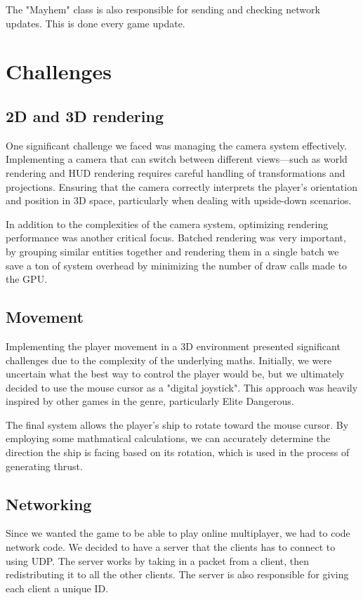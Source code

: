 \documentclass[journal]{IEEEtran}
\begin{document}
The "Mayhem" class is also responsible for sending and checking network updates. This is done every game update.
\section{Challenges}\label{Section:Challenges}
\subsection{2D and 3D rendering}
One significant challenge we faced was managing the camera system effectively. Implementing a camera that can switch between different views—such as world rendering and HUD rendering requires careful handling of transformations and projections.
Ensuring that the camera correctly interprets the player's orientation and position in 3D space, particularly when dealing with upside-down scenarios.

In addition to the complexities of the camera system, optimizing rendering performance was another critical focus. Batched rendering was very important, by grouping similar entities together and rendering them in a single batch we save a ton of system overhead by minimizing the number of draw calls made to the GPU.

\subsection{Movement}
Implementing the player movement in a 3D environment presented significant challenges due to the complexity of the underlying maths. Initially, we were uncertain what the best way to control the player would be, but we ultimately decided to use the mouse cursor as a "digital joystick". This approach was heavily inspired by other games in the genre, particularly Elite Dangerous.

The final system allows the player's ship to rotate toward the mouse cursor. By employing some mathmatical calculations, we can accurately determine the direction the ship is facing based on its rotation, which is used in the process of generating thrust.

\subsection{Networking}
Since we wanted the game to be able to play online multiplayer, we had to code network code.
We decided to have a server that the clients has to connect to using UDP. The server works by taking in a packet from a client, then redistributing it to all the other clients. The server is also responsible for giving each client a unique ID.
\end{document}
